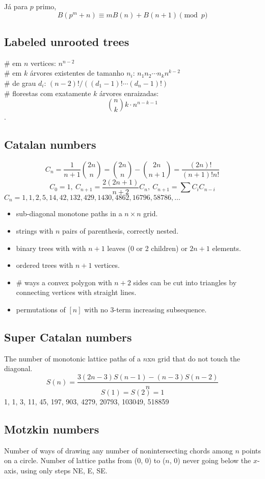       Já para $p$ primo,
		\[ B(p^m+n)\equiv mB(n)+B(n+1) \pmod{p} \]

	\subsection{Labeled unrooted trees}
		\# em $n$ vertices: $n^{n-2}$\\
		\# em $k$ árvores existentes de tamanho $n_i$: $n_1n_2\cdots n_k n^{k-2}$ \\
		\# de grau $d_i$: $(n-2)! / ((d_1-1)! \cdots (d_n-1)!)$\\
		\# florestas com exatamente $k$ árvores enraizadas: $$\binom{n}{k} k \cdot n^{n-k-1}$$.
   
    
	\subsection{Catalan numbers}
		\[ C_n=\frac{1}{n+1}\binom{2n}{n}= \binom{2n}{n}-\binom{2n}{n+1} = \frac{(2n)!}{(n+1)!n!} \]
		\[ C_0=1,\ C_{n+1} = \frac{2(2n+1)}{n+2}C_n,\ C_{n+1}=\sum C_iC_{n-i} \]
		${C_n = 1, 1, 2, 5, 14, 42, 132, 429, 1430, 4862, 16796, 58786, \dots}$
		\begin{itemize}[noitemsep]
			\item sub-diagonal monotone paths in a $n\times n$ grid.
			\item strings with $n$ pairs of parenthesis, correctly nested.
			\item binary trees with with $n+1$ leaves (0 or 2 children) or $2n + 1$ elements.
			\item ordered trees with $n+1$ vertices.
			\item \# ways a convex polygon with $n+2$ sides can be cut into triangles by connecting vertices with straight lines.
			\item permutations of $[n]$ with no 3-term increasing subsequence.
		\end{itemize}
		\newline
    \subsection{Super Catalan numbers}
    The number of monotonic lattice paths of a $n$x$n$ grid that do not touch the diagonal.\\
    $$S(n) = \frac{3(2n-3)S(n-1)-(n-3)S(n-2)}{n}$$
    $$S(1) = S(2) = 1$$
    1, 1, 3, 11, 45, 197, 903, 4279, 20793, 103049, 518859\\

    \subsection{Motzkin numbers}
    Number of ways of drawing any number of nonintersecting chords among $n$ points on a circle. Number of lattice paths from (0, 0) to ($n$, 0) never going below the $x$-axis, using only steps NE, E, SE.\\
    
